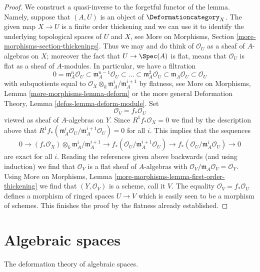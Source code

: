 \begin{proof}
We construct a quasi-inverse to the forgetful functor of the lemma.
Namely, suppose that $(A, U)$ is an object of $\Deformationcategory_X$.
The given map $X \to U$ is a finite order thickening and we can use
it to identify the underlying topological spaces of $U$ and $X$, see
More on Morphisms, Section \ref{more-morphisms-section-thickenings}.
Thus we may and do think of $\mathcal{O}_U$ as a sheaf of
$A$-algebras on $X$; moreover the fact that $U \to \Spec(A)$ is
flat, means that $\mathcal{O}_U$ is flat as a sheaf of $A$-modules.
In particular, we have a filtration
$$
0 = \mathfrak m_A^n\mathcal{O}_U \subset
\mathfrak m_A^{n - 1}\mathcal{O}_U \subset \ldots \subset
\mathfrak m_A^2\mathcal{O}_U \subset
\mathfrak m_A\mathcal{O}_U \subset \mathcal{O}_U
$$
with subquotients equal to
$\mathcal{O}_X \otimes_k \mathfrak m_A^i/\mathfrak m_A^{i + 1}$
by flatness, see More on Morphisms, Lemma \ref{more-morphisms-lemma-deform}
or the more general Deformation Theory, Lemma \ref{defos-lemma-deform-module}.
Set
$$
\mathcal{O}_V = f_*\mathcal{O}_U
$$
viewed as sheaf of $A$-algebras on $Y$. Since
$R^1f_*\mathcal{O}_X = 0$ we find by the description above that
$R^1f_*(\mathfrak m_A^i\mathcal{O}_U/\mathfrak m_A^{i + 1}\mathcal{O}_U) = 0$
for all $i$. This implies that the sequences
$$
0 \to
(f_*\mathcal{O}_X) \otimes_k \mathfrak m_A^i/\mathfrak m_A^{i + 1} \to
f_*(\mathcal{O}_U/\mathfrak m_A^{i + 1}\mathcal{O}_U) \to
f_*(\mathcal{O}_U/\mathfrak m_A^i\mathcal{O}_U) \to 0
$$
are exact for all $i$. Reading the references given above backwards
(and using induction) we find that $\mathcal{O}_V$ is a flat
sheaf of $A$-algebras with
$\mathcal{O}_V/\mathfrak m_A\mathcal{O}_V = \mathcal{O}_Y$.
Using More on Morphisms, Lemma
\ref{more-morphisms-lemma-first-order-thickening}
we find that $(Y, \mathcal{O}_V)$ is a scheme, call it $V$.
The equality $\mathcal{O}_V = f_*\mathcal{O}_U$ defines a
morphism of ringed spaces $U \to V$ which is easily seen to be
a morphism of schemes. This finishes the proof by the
flatness already established.
\end{proof}

\section{Algebraic spaces}
\label{examples-defos-section-algebraic-spaces}
The deformation theory of algebraic spaces.

